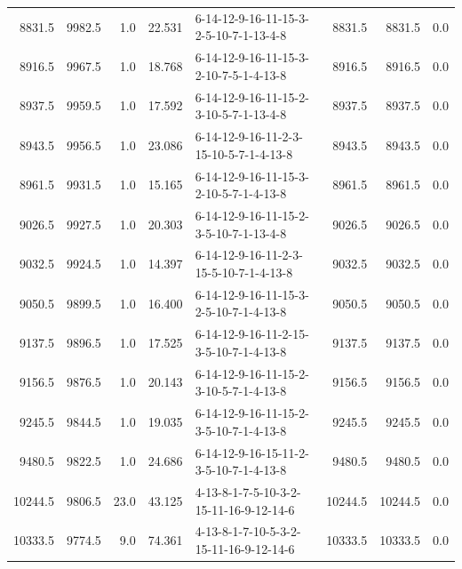\begin{tabular}{rrrrlrrr}
  8831.5 &   9982.5 &            1.0 &             22.531 &  6-14-12-9-16-11-15-3-2-5-10-7-1-13-4-8 &        8831.5 &          8831.5 &       0.0 \\
  8916.5 &   9967.5 &            1.0 &             18.768 &  6-14-12-9-16-11-15-3-2-10-7-5-1-4-13-8 &        8916.5 &          8916.5 &       0.0 \\
  8937.5 &   9959.5 &            1.0 &             17.592 &  6-14-12-9-16-11-15-2-3-10-5-7-1-13-4-8 &        8937.5 &          8937.5 &       0.0 \\
  8943.5 &   9956.5 &            1.0 &             23.086 &  6-14-12-9-16-11-2-3-15-10-5-7-1-4-13-8 &        8943.5 &          8943.5 &       0.0 \\
  8961.5 &   9931.5 &            1.0 &             15.165 &  6-14-12-9-16-11-15-3-2-10-5-7-1-4-13-8 &        8961.5 &          8961.5 &       0.0 \\
  9026.5 &   9927.5 &            1.0 &             20.303 &  6-14-12-9-16-11-15-2-3-5-10-7-1-13-4-8 &        9026.5 &          9026.5 &       0.0 \\
  9032.5 &   9924.5 &            1.0 &             14.397 &  6-14-12-9-16-11-2-3-15-5-10-7-1-4-13-8 &        9032.5 &          9032.5 &       0.0 \\
  9050.5 &   9899.5 &            1.0 &             16.400 &  6-14-12-9-16-11-15-3-2-5-10-7-1-4-13-8 &        9050.5 &          9050.5 &       0.0 \\
  9137.5 &   9896.5 &            1.0 &             17.525 &  6-14-12-9-16-11-2-15-3-5-10-7-1-4-13-8 &        9137.5 &          9137.5 &       0.0 \\
  9156.5 &   9876.5 &            1.0 &             20.143 &  6-14-12-9-16-11-15-2-3-10-5-7-1-4-13-8 &        9156.5 &          9156.5 &       0.0 \\
  9245.5 &   9844.5 &            1.0 &             19.035 &  6-14-12-9-16-11-15-2-3-5-10-7-1-4-13-8 &        9245.5 &          9245.5 &       0.0 \\
  9480.5 &   9822.5 &            1.0 &             24.686 &  6-14-12-9-16-15-11-2-3-5-10-7-1-4-13-8 &        9480.5 &          9480.5 &       0.0 \\
 10244.5 &   9806.5 &           23.0 &             43.125 &  4-13-8-1-7-5-10-3-2-15-11-16-9-12-14-6 &       10244.5 &         10244.5 &       0.0 \\
 10333.5 &   9774.5 &            9.0 &             74.361 &  4-13-8-1-7-10-5-3-2-15-11-16-9-12-14-6 &       10333.5 &         10333.5 &       0.0 \\

\end{tabular}
